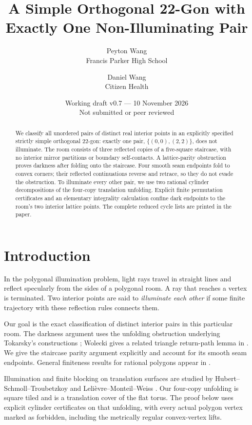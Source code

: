\documentclass[11pt]{article}
\title{A Simple Orthogonal 22-Gon with\\Exactly One Non-Illuminating Pair}
\author{Peyton Wang\\\small Francis Parker High School \and Daniel Wang\\\small Citizen Health}
\date{Working draft v0.7 --- 10 November 2026\\\small Not submitted or peer reviewed}
\theoremstyle{remark}
\begin{document}
\maketitle
\vspace{-1.2em}
\begin{abstract}
We classify all unordered pairs of distinct real interior points in an explicitly specified strictly simple orthogonal 22-gon: exactly one pair, $\{(0,0),(2,2)\}$, does not illuminate. The room consists of three reflected copies of a five-square staircase, with no interior mirror partitions or boundary self-contacts. A lattice-parity obstruction proves darkness after folding onto the staircase. Four smooth seam endpoints fold to convex corners; their reflected continuations reverse and retrace, so they do not evade the obstruction. To illuminate every other pair, we use two rational cylinder decompositions of the four-copy translation unfolding. Explicit finite permutation certificates and an elementary integrality calculation confine dark endpoints to the room's two interior lattice points. The complete reduced cycle lists are printed in the paper.
\end{abstract}

\section{Introduction}
In the polygonal illumination problem, light rays travel in straight lines and reflect specularly from the sides of a polygonal room. A ray that reaches a vertex is terminated. Two interior points are said to \emph{illuminate each other} if some finite trajectory with these reflection rules connects them.

Our goal is the exact classification of distinct interior pairs in this particular room. The darkness argument uses the unfolding obstruction underlying Tokarsky's constructions \cite{Tokarsky1995}; Wolecki gives a related triangle return-path lemma in \cite[Lemma~3.1]{Wolecki2024}. We give the staircase parity argument explicitly and account for its smooth seam endpoints. General finiteness results for rational polygons appear in \cite[Theorem~1.2]{Wolecki2024}.

Illumination and finite blocking on translation surfaces are studied by Hubert--Schmoll--Troubetzkoy \cite{HST} and Leli\`evre--Monteil--Weiss \cite{LMW}. Our four-copy unfolding is square tiled and is a translation cover of the flat torus. The proof below uses explicit cylinder certificates on that unfolding, with every actual polygon vertex marked as forbidden, including the metrically regular convex-vertex lifts.
\end{document}
